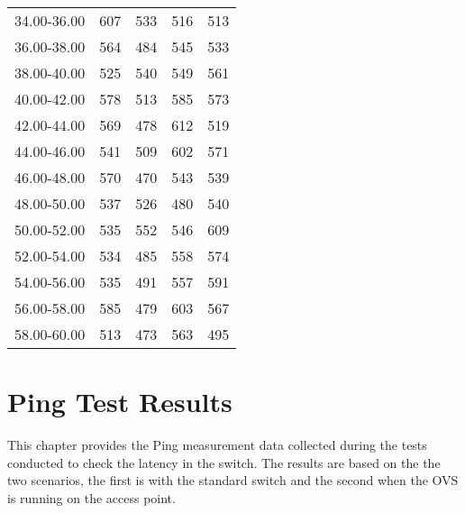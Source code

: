 \begin{table}[]
\begin{tabular}{lllll}
		34.00-36.00 & 607              & 533              & 516              & 513              \\
		36.00-38.00 & 564              & 484              & 545              & 533              \\
		38.00-40.00 & 525              & 540              & 549              & 561              \\
		40.00-42.00 & 578              & 513              & 585              & 573              \\
		42.00-44.00 & 569              & 478              & 612              & 519              \\
		44.00-46.00 & 541              & 509              & 602              & 571              \\
		46.00-48.00 & 570              & 470              & 543              & 539              \\
		48.00-50.00 & 537              & 526              & 480              & 540              \\
		50.00-52.00 & 535              & 552              & 546              & 609              \\
		52.00-54.00 & 534              & 485              & 558              & 574              \\
		54.00-56.00 & 535              & 491              & 557              & 591              \\
		56.00-58.00 & 585              & 479              & 603              & 567              \\
		58.00-60.00 & 513              & 473              & 563              & 495             
	\end{tabular}
\end{table}

\chapter{Ping Test Results}\label{app:ch:Ping_results}

This chapter provides the Ping measurement data collected during the tests conducted to check the latency in the switch. The results are based on the the two scenarios, the first is with the standard switch and the second when the OVS is running on the access point.
